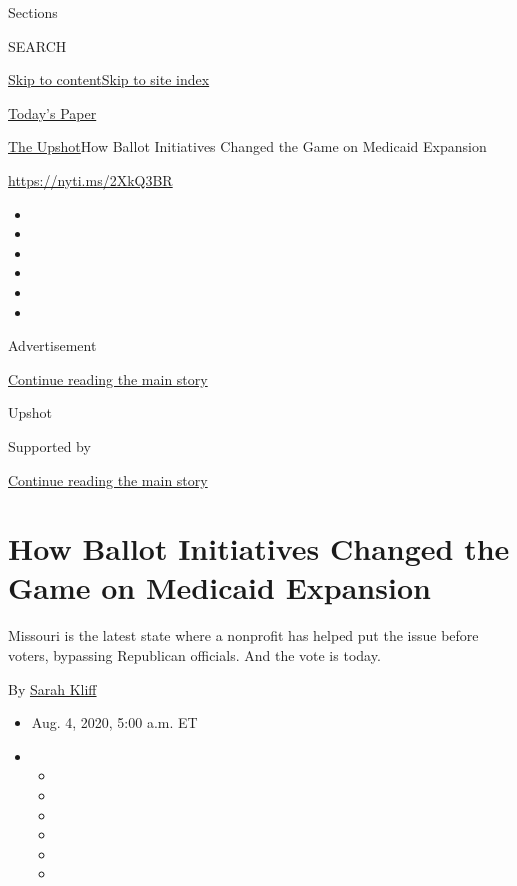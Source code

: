 Sections

SEARCH

\protect\hyperlink{site-content}{Skip to
content}\protect\hyperlink{site-index}{Skip to site index}

\href{https://myaccount.nytimes.com/auth/login?response_type=cookie\&client_id=vi}{}

\href{https://www.nytimes.com/section/todayspaper}{Today's Paper}

\href{/section/upshot}{The Upshot}\textbar{}How Ballot Initiatives
Changed the Game on Medicaid Expansion

\url{https://nyti.ms/2XkQ3BR}

\begin{itemize}
\item
\item
\item
\item
\item
\item
\end{itemize}

Advertisement

\protect\hyperlink{after-top}{Continue reading the main story}

Upshot

Supported by

\protect\hyperlink{after-sponsor}{Continue reading the main story}

\hypertarget{how-ballot-initiatives-changed-the-game-on-medicaid-expansion}{%
\section{How Ballot Initiatives Changed the Game on Medicaid
Expansion}\label{how-ballot-initiatives-changed-the-game-on-medicaid-expansion}}

Missouri is the latest state where a nonprofit has helped put the issue
before voters, bypassing Republican officials. And the vote is today.

By \href{https://www.nytimes.com/by/sarah-kliff}{Sarah Kliff}

\begin{itemize}
\item
  Aug. 4, 2020, 5:00 a.m. ET
\item
  \begin{itemize}
  \item
  \item
  \item
  \item
  \item
  \item
  \end{itemize}
\end{itemize}

